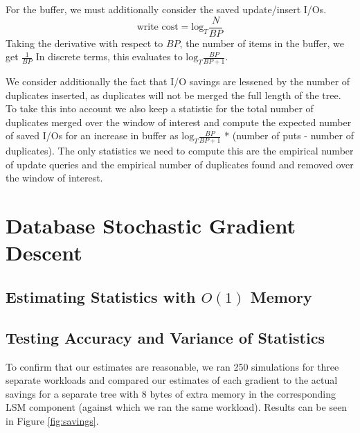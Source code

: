 \documentclass{sig-alternate-05-2015}
\begin{document}
For the buffer, we must additionally consider the saved update/insert I/Os.  $$
\text{write cost} = \textrm{log}_{T} \frac{N}{BP} $$ Taking the derivative with
respect to $BP$, the number of items in the buffer, we get $\frac{1}{BP}$ In
discrete terms, this evaluates to $\textrm{log}_{T} \frac{BP}{BP+1}$. 

We consider additionally the fact that I/O savings are lessened by the number
of duplicates inserted, as duplicates will not be merged the full length of the
tree. To take this into account we also keep a statistic for the total number
of duplicates merged over the window of interest and compute the expected
number of saved I/Os for an increase in buffer as $\textrm{log}_{T}
\frac{BP}{BP+1}$ * (number of puts - number of duplicates).  The only
statistics we need to compute this are the empirical number of update queries
and the empirical number of duplicates found and removed over the window of
interest.

\section{Database Stochastic Gradient Descent}

\subsection{Estimating Statistics with $O(1)$ Memory}

\subsection{Testing Accuracy and Variance of Statistics}

To confirm that our estimates are reasonable, we ran 250 simulations for three
separate workloads and compared our estimates of each gradient to the actual
savings for a separate tree with 8 bytes of extra memory in the corresponding
LSM component (against which we ran the same workload). Results can be seen in
Figure \ref{fig:savings}.
\end{document}
